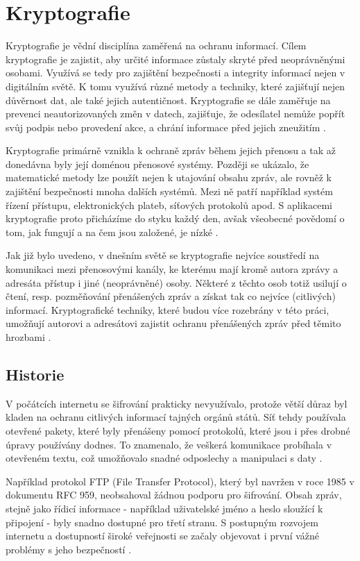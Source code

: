 \section{Kryptografie}
Kryptografie je vědní disciplína zaměřená na ochranu informací. Cílem kryptografie je zajistit, aby určité informace zůstaly skryté před neoprávněnými osobami. Využívá se tedy pro zajištění bezpečnosti a integrity informací nejen v digitálním světě. K tomu využívá různé metody a techniky, které zajišťují nejen důvěrnost dat, ale také jejich autentičnost. Kryptografie se dále zaměřuje na prevenci neautorizovaných změn v datech, zajišťuje, že odesílatel nemůže popřít svůj podpis nebo provedení akce, a chrání informace před jejich zneužitím \parencite{tesar2021}.

Kryptografie primárně vznikla k ochraně zpráv během jejich přenosu a tak až donedávna byly její doménou přenosové systémy. Později se ukázalo, že matematické metody lze použít nejen k utajování obsahu zpráv, ale rovněž k zajištění bezpečnosti mnoha dalších systémů. Mezi ně patří například systém řízení přístupu, elektronických plateb, síťových protokolů apod. S aplikacemi kryptografie proto přicházíme do styku každý den, avšak všeobecné povědomí o tom, jak fungují a na čem jsou založené, je nízké \parencite{burda2019}.

Jak již bylo uvedeno, v dnešním světě se kryptografie nejvíce soustředí na komunikaci mezi přenosovými kanály, ke kterému mají kromě autora zprávy a adresáta přístup i jiné (neoprávněné) osoby. Některé z těchto osob totiž usilují o čtení, resp. pozměňování přenášených zpráv a získat tak co nejvíce (citlivých) informací. Kryptografické techniky, které budou více rozebrány v této práci, umožňují autorovi a adresátovi zajistit ochranu přenášených zpráv před těmito hrozbami \parencite{sedlak2021}.

\subsection{Historie}

V počátcích internetu se šifrování prakticky nevyužívalo, protože větší důraz byl kladen na ochranu citlivých informací tajných orgánů států. Síť tehdy používala otevřené pakety, které byly přenášeny pomocí protokolů, které jsou i přes drobné úpravy používány dodnes. To znamenalo, že veškerá komunikace probíhala v otevřeném textu, což umožňovalo snadné odposlechy a manipulaci s daty \parencite{erben2014}.

Například protokol FTP (File Transfer Protocol), který byl navržen v roce 1985 v dokumentu RFC 959, neobsahoval žádnou podporu pro šifrování. Obsah zpráv, stejně jako řídicí informace - například uživatelské jméno a heslo sloužící k připojení - byly snadno dostupné pro třetí stranu. S postupným rozvojem internetu a dostupností široké veřejnosti se začaly objevovat i první vážné problémy s jeho bezpečností \parencite{cerna2012}.

